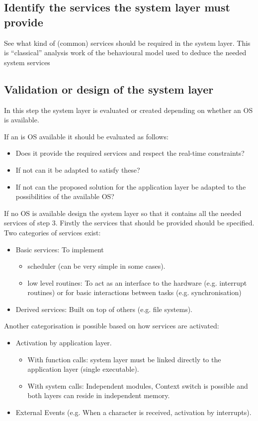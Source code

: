 \documentclass[../main.tex]{subfiles}
\begin{document}
\subsection{Identify the services the system layer must provide}
\label{sss:services}
See what kind of (common) services should be required in the system layer. 
This is ``classical'' analysis work of the behavioural model used to deduce the needed system services




\subsection{Validation or design of the system layer}
\label{sss:valid}
In  this step the system layer is evaluated or created depending on whether an OS is available.

If an is OS available it should be evaluated as follows:
\begin{itemize}
	\item Does it provide the required services and respect the real-time constraints? 
	\item If not can it be adapted to satisfy these?
	\item If not can the proposed solution for the application layer be adapted to the possibilities of the available OS?
\end{itemize}

If no OS is available design the system layer so that it contains all the needed services of step 3.
Firstly the services that should be provided should be specified. 
Two categories of services exist: 
\begin{itemize}
	\item Basic services: To implement
	\begin{itemize}
		\item scheduler (can be very simple in some cases).
		\item low level routines: To act as an interface to the hardware (e.g. interrupt routines) or for basic interactions between tasks (e.g. synchronisation)
	\end{itemize}
	
	\item Derived services: Built on top of others (e.g. file systems).
\end{itemize}

Another categorisation is possible based on how services are activated: 
\begin{itemize}
	\item Activation by application layer. 
	\begin{itemize}
		\item With function calls: system layer must be linked directly to the application layer (single executable). 
		\item With system calls: Independent modules, Context switch is possible and both layers can reside in independent memory.  
	\end{itemize}
	\item External Events (e.g. When a character is received, activation by interrupts). 
\end{itemize}
\end{document}
